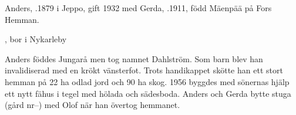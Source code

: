 Anders, .1879 i Jeppo, gift 1932 med Gerda, .1911, född Mäenpää på Fors Hemman.
\begin{jhchildren}
  \item {}
  \item {}
  \item {}
  \item {}
  \item {}
  \item {}
  \item {}, bor i Nykarleby
\end{jhchildren}
Anders föddes Jungarå men tog namnet Dahlström. Som barn blev han invalidiserad med en krökt vänsterfot. Trots handikappet skötte han ett stort hemman på 22 ha odlad jord och 90 ha skog. 1956 byggdes med sönernas hjälp ett nytt fähus i tegel med hölada och sädesboda. Anders och Gerda bytte stuga (gård nr--) med Olof när han övertog hemmanet.


